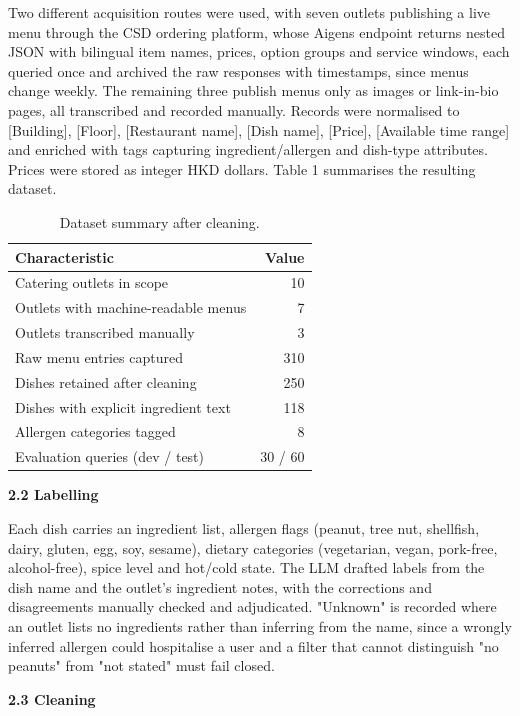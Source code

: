 \documentclass{article}
\begin{document}
Two different acquisition routes were used, with seven outlets publishing a live menu through the CSD ordering platform, whose Aigens endpoint returns nested JSON with bilingual item names, prices, option groups and service windows, each queried once and archived the raw responses with timestamps, since menus change weekly. The remaining three publish menus only as images or link-in-bio pages, all transcribed and recorded manually. Records were normalised to [Building], [Floor], [Restaurant name], [Dish name], [Price], [Available time range] and enriched with tags capturing ingredient/allergen and dish-type attributes. Prices were stored as integer HKD dollars. Table 1 summarises the resulting dataset.

\begin{table}[t]
  \centering
  \caption{Dataset summary after cleaning.}
  \label{tab:dataset}
  \begin{tabular}{lr}
    \toprule
    Characteristic & Value \\
    \midrule
    Catering outlets in scope & 10 \\
    Outlets with machine-readable menus & 7 \\
    Outlets transcribed manually & 3 \\
    Raw menu entries captured & 310 \\
    Dishes retained after cleaning & 250 \\
    Dishes with explicit ingredient text & 118 \\
    Allergen categories tagged & 8 \\
    Evaluation queries (dev / test) & 30 / 60 \\
    \bottomrule
  \end{tabular}
\end{table}

\textbf{2.2 Labelling} 

Each dish carries an ingredient list, allergen flags (peanut, tree nut, shellfish, dairy, gluten, egg, soy, sesame), dietary categories (vegetarian, vegan, pork-free, alcohol-free), spice level and hot/cold state. The LLM drafted labels from the dish name and the outlet's ingredient notes, with the corrections and disagreements manually checked and adjudicated. "Unknown" is recorded where an outlet lists no ingredients rather than inferring from the name, since a wrongly inferred allergen could hospitalise a user and a filter that cannot distinguish "no peanuts" from "not stated" must fail closed.

\textbf{2.3 Cleaning}
\end{document}
